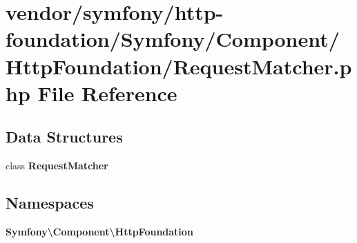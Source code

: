 \section{vendor/symfony/http-\/foundation/\+Symfony/\+Component/\+Http\+Foundation/\+Request\+Matcher.php File Reference}
\label{_request_matcher_8php}
\subsection*{Data Structures}
\begin{DoxyCompactItemize}
\item 
class {\bf Request\+Matcher}
\end{DoxyCompactItemize}
\subsection*{Namespaces}
\begin{DoxyCompactItemize}
\item 
 {\bf Symfony\textbackslash{}\+Component\textbackslash{}\+Http\+Foundation}
\end{DoxyCompactItemize}
